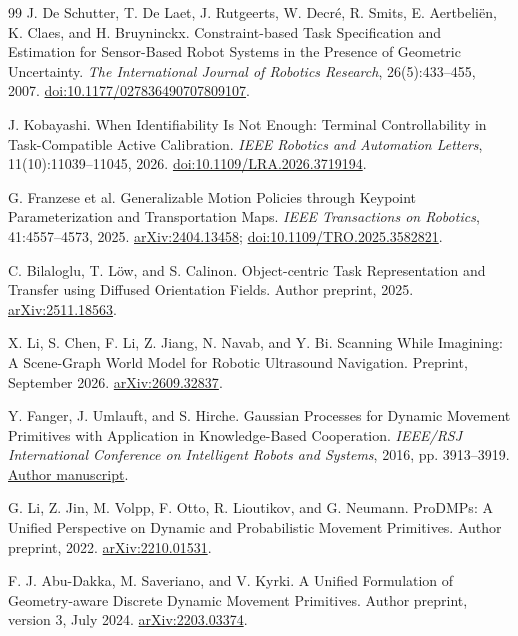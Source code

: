 \documentclass[11pt,a4paper]{article}
\theoremstyle{cn}
\begin{document}
\begin{thebibliography}{99}
\small
{}
J. De Schutter, T. De Laet, J. Rutgeerts, W. Decré, R. Smits, E. Aertbeliën, K. Claes, and H. Bruyninckx.
Constraint-based Task Specification and Estimation for Sensor-Based Robot Systems in the Presence of Geometric Uncertainty.
\emph{The International Journal of Robotics Research}, 26(5):433--455, 2007.
\href{https://doi.org/10.1177/027836490707809107}{doi:10.1177/027836490707809107}.

J. Kobayashi.
When Identifiability Is Not Enough: Terminal Controllability in Task-Compatible Active Calibration.
\emph{IEEE Robotics and Automation Letters}, 11(10):11039--11045, 2026.
\href{https://doi.org/10.1109/LRA.2026.3719194}{doi:10.1109/LRA.2026.3719194}.

G. Franzese et al.
Generalizable Motion Policies through Keypoint Parameterization and Transportation Maps.
\emph{IEEE Transactions on Robotics}, 41:4557--4573, 2025.
\href{https://arxiv.org/abs/2404.13458}{arXiv:2404.13458};
\href{https://doi.org/10.1109/TRO.2025.3582821}{doi:10.1109/TRO.2025.3582821}.

C. Bilaloglu, T. Löw, and S. Calinon.
Object-centric Task Representation and Transfer using Diffused Orientation Fields.
Author preprint, 2025.
\href{https://arxiv.org/abs/2511.18563}{arXiv:2511.18563}.

X. Li, S. Chen, F. Li, Z. Jiang, N. Navab, and Y. Bi.
Scanning While Imagining: A Scene-Graph World Model for Robotic Ultrasound Navigation.
Preprint, September 2026.
\href{https://arxiv.org/abs/2609.32837}{arXiv:2609.32837}.

Y. Fanger, J. Umlauft, and S. Hirche.
Gaussian Processes for Dynamic Movement Primitives with Application in Knowledge-Based Cooperation.
\emph{IEEE/RSJ International Conference on Intelligent Robots and Systems}, 2016, pp. 3913--3919.
\href{https://mediatum.ub.tum.de/doc/1324762/170776.pdf}{Author manuscript}.

G. Li, Z. Jin, M. Volpp, F. Otto, R. Lioutikov, and G. Neumann.
ProDMPs: A Unified Perspective on Dynamic and Probabilistic Movement Primitives.
Author preprint, 2022.
\href{https://arxiv.org/abs/2210.01531}{arXiv:2210.01531}.

F. J. Abu-Dakka, M. Saveriano, and V. Kyrki.
A Unified Formulation of Geometry-aware Discrete Dynamic Movement Primitives.
Author preprint, version 3, July 2024.
\href{https://arxiv.org/abs/2203.03374}{arXiv:2203.03374}.


\end{thebibliography}
\end{document}
